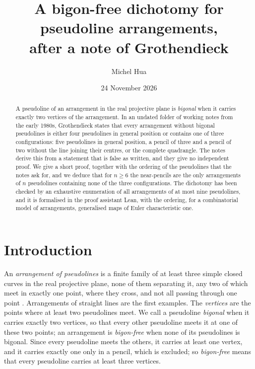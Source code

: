 \documentclass[11pt,a4paper]{amsart}
\title[A bigon-free dichotomy]{A bigon-free dichotomy for pseudoline arrangements,\\ after a note of Grothendieck}
\author{Michel Hua}
\date{24 November 2026}
\theoremstyle{definition}
\theoremstyle{remark}
\begin{document}
\begin{abstract}
A pseudoline of an arrangement in the real projective plane is \emph{bigonal} when it carries exactly two vertices of the arrangement. In an undated folder of working notes from the early 1980s, Grothendieck states that every arrangement without bigonal pseudolines is either four pseudolines in general position or contains one of three configurations: five pseudolines in general position, a pencil of three and a pencil of two without the line joining their centres, or the complete quadrangle. The notes derive this from a statement that is false as written, and they give no independent proof. We give a short proof, together with the ordering of the pseudolines that the notes ask for, and we deduce that for $n \ge 6$ the near-pencils are the only arrangements of $n$ pseudolines containing none of the three configurations. The dichotomy has been checked by an exhaustive enumeration of all arrangements of at most nine pseudolines, and it is formalised in the proof assistant Lean, with the ordering, for a combinatorial model of arrangements, generalised maps of Euler characteristic one.
\end{abstract}

\maketitle

\section{Introduction}

An \emph{arrangement of pseudolines} is a finite family of at least three simple closed curves in the real projective plane, none of them separating it, any two of which meet in exactly one point, where they cross, and not all passing through one point \cite{grunbaum1972,felsnergoodman2017}. Arrangements of straight lines are the first examples. The \emph{vertices} are the points where at least two pseudolines meet. We call a pseudoline \emph{bigonal} when it carries exactly two vertices, so that every other pseudoline meets it at one of these two points; an arrangement is \emph{bigon-free} when none of its pseudolines is bigonal. Since every pseudoline meets the others, it carries at least one vertex, and it carries exactly one only in a pencil, which is excluded; so \emph{bigon-free} means that every pseudoline carries at least three vertices.
\end{document}
